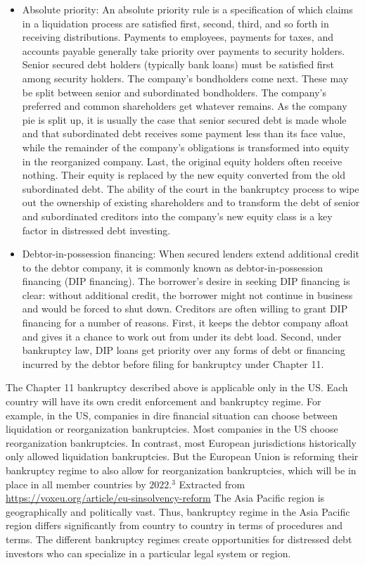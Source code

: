 \documentclass[11pt]{article}
\begin{document}
\begin{itemize}
  \item Absolute priority: An absolute priority rule is a specification of which claims in a liquidation process are satisfied first, second, third, and so forth in receiving distributions. Payments to employees, payments for taxes, and accounts payable generally take priority over payments to security holders. Senior secured debt holders (typically bank loans) must be satisfied first among security holders. The company's bondholders come next. These may be split between senior and subordinated bondholders. The company's preferred and common shareholders get whatever remains. As the company pie is split up, it is usually the case that senior secured debt is made whole and that subordinated debt receives some payment less than its face value, while the remainder of the company's obligations is transformed into equity in the reorganized company. Last, the original equity holders often receive nothing. Their equity is replaced by the new equity converted from the old subordinated debt. The ability of the court in the bankruptcy process to wipe out the ownership of existing shareholders and to transform the debt of senior and subordinated creditors into the company's new equity class is a key factor in distressed debt investing.
  \item Debtor-in-possession financing: When secured lenders extend additional credit to the debtor company, it is commonly known as debtor-in-possession financing (DIP financing). The borrower's desire in seeking DIP financing is clear: without additional credit, the borrower might not continue in business and would be forced to shut down. Creditors are often willing to grant DIP financing for a number of reasons. First, it keeps the debtor company afloat and gives it a chance to work out from under its debt load. Second, under bankruptcy law, DIP loans get priority over any forms of debt or financing incurred by the debtor before filing for bankruptcy under Chapter 11.
\end{itemize}

The Chapter 11 bankruptcy described above is applicable only in the US. Each country will have its own credit enforcement and bankruptcy regime. For example, in the US, companies in dire financial situation can choose between liquidation or reorganization bankruptcies. Most companies in the US choose reorganization bankruptcies. In contrast, most European jurisdictions historically only allowed liquidation bankruptcies. But the European Union is reforming their bankruptcy regime to also allow for reorganization bankruptcies, which will be in place in all member countries by $2022 .^{3}$ Extracted from \href{https://voxeu.org/article/eu-sinsolvency-reform}{https://voxeu.org/article/eu-sinsolvency-reform} The Asia Pacific region is geographically and politically vast. Thus, bankruptcy regime in the Asia Pacific region differs significantly from country to country in terms of procedures and terms. The different bankruptcy regimes create opportunities for distressed debt investors who can specialize in a particular legal system or region.
\end{document}
